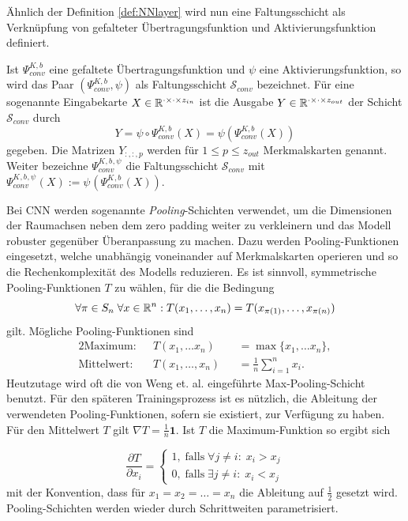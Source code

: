 Ähnlich der Definition \ref{def:NNlayer} wird nun eine Faltungsschicht als Verknüpfung von gefalteter Übertragungsfunktion und Aktivierungsfunktion definiert.

\begin{defi}[Faltungsschicht]
    \label{def:convlayer}
    Ist $\Psi_{conv}^{K,b}$ eine gefaltete Übertragungsfunktion und $\psi$ eine Aktivierungsfunktion, so wird das Paar $(\Psi_{conv}^{K,b}, \psi)$ als Faltungsschicht $\mathcal{S}_{conv}$ bezeichnet. Für eine sogenannte Eingabekarte $X \in \mathbb{R}^{\cdot \times \cdot \times z_{in}}$ ist die Ausgabe $Y \in \mathbb{R}^{\cdot \times \cdot \times z_{out}}$ der Schicht $\mathcal{S}_{conv}$ durch
    \[Y=\psi \circ \Psi_{conv}^{K,b}(X)= \psi\left(\Psi_{conv}^{K,b}(X)\right)
        \] 
        gegeben. Die Matrizen $Y_{:,:,p}$ werden für $1 \leq p \leq z_{out}$ Merkmalskarten genannt. Weiter bezeichne $\Psi_{conv}^{K^{},b^{},\psi_{}}$ die Faltungsschicht $\mathcal{S}_{conv}$ mit $\Psi_{conv}^{K^{},b^{},\psi_{}}(X):= \psi_{} \left(\Psi_{conv}^{K^{},b^{}}(X)\right)$.
\end{defi}

Bei CNN werden sogenannte \textit{Pooling}-Schichten verwendet, um die Dimensionen der Raumachsen neben dem zero padding weiter zu verkleinern und das Modell robuster gegenüber Überanpassung zu machen. Dazu werden Pooling-Funktionen eingesetzt, welche unabhängig voneinander auf Merkmalskarten operieren und so die Rechenkomplexität des Modells reduzieren. Es ist sinnvoll, symmetrische Pooling-Funktionen $T$ zu wählen, für die die Bedingung
\begin{equation*}
    \forall \pi \in S_n \; \forall x \in \mathbb{R}^n: T(x_1, \ldots, x_n)=T(x_{\pi(1)}, \ldots, x_{\pi(n)})
\end{equation*}
gilt. Mögliche Pooling-Funktionen sind 
\begin{alignat*}{2}
    \text{Maximum}: \; \;&T(x_1, \ldots x_n) &&= \max\{x_1, \ldots x_n\},\\
    \text{Mittelwert}: \; \;&T(x_1, \ldots, x_n) &&= \frac{1}{n} \sum_{i=1}^n x_i. 
 \end{alignat*}
Heutzutage wird oft die von Weng et. al.\cite{weng1992cresceptron} eingeführte Max-Pooling-Schicht benutzt.
Für den späteren Trainingsprozess ist es nützlich, die Ableitung der verwendeten Pooling-Funktionen, sofern sie existiert, zur Verfügung zu haben. Für den Mittelwert $T$ gilt $\nabla T=\frac{1}{n} \textbf{1}$. Ist $T$ die Maximum-Funktion so ergibt sich

\begin{equation*}
    \frac{\partial T}{\partial x_i}= \begin{cases}
        1 , \; \text{falls}  \; \forall j \neq i: \; x_i >x_j \\
        0 , \; \text{falls}  \; \exists j \neq i: \; x_i <x_j
    \end{cases}
\end{equation*}
mit der Konvention, dass für $x_1=x_2= \ldots=x_n$ die Ableitung auf $\frac{1}{2}
$ gesetzt wird. Pooling-Schichten werden wieder durch Schrittweiten parametrisiert.

